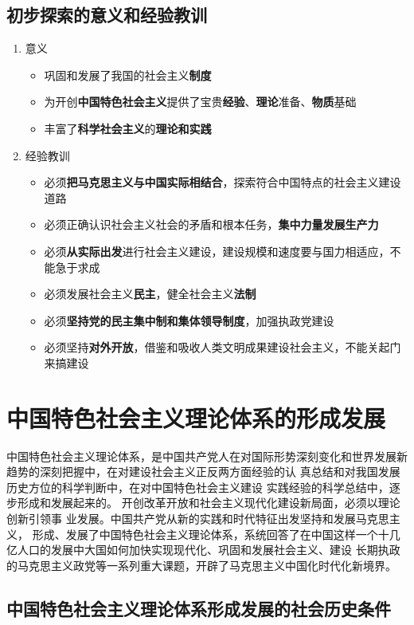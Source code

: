 \documentclass[12pt,openany]{ctexbook}
\begin{document}
\section{初步探索的意义和经验教训}
\begin{enumerate}
  \item 意义
\begin{itemize}
  \item 巩固和发展了我国的社会主义\textbf{制度}
  \item 为开创\textbf{中国特色社会主义}提供了宝贵\textbf{经验}、\textbf{理论}准备、\textbf{物质}基础
  \item 丰富了\textbf{科学社会主义}的\textbf{理论和实践}
\end{itemize}
  \item 经验教训
\begin{itemize}
  \item 必须\textbf{把马克思主义与中国实际相结合}，探索符合中国特点的社会主义建设道路
  \item 必须正确认识社会主义社会的矛盾和根本任务，\textbf{集中力量发展生产力}
  \item 必须\textbf{从实际出发}进行社会主义建设，建设规模和速度要与国力相适应，不能急于求成
  \item 必须发展社会主义\textbf{民主}，健全社会主义\textbf{法制}
  \item 必须\textbf{坚持党的民主集中制和集体领导制度}，加强执政党建设
  \item 必须坚持\textbf{对外开放}，借鉴和吸收人类文明成果建设社会主义，不能关起门来搞建设
\end{itemize}
\end{enumerate}
\chapter{中国特色社会主义理论体系的形成发展}
中国特色社会主义理论体系，是中国共产党人在对国际形势深刻变化和世界发展新趋势的深刻把握中，在对建设社会主义正反两方面经验的认 真总结和对我国发展历史方位的科学判断中，在对中国特色社会主义建设 实践经验的科学总结中，逐步形成和发展起来的。
开创改革开放和社会主义现代化建设新局面，必须以理论创新引领事 业发展。中国共产党从新的实践和时代特征出发坚持和发展马克思主义， 形成、发展了中国特色社会主义理论体系，系统回答了在中国这样一个十几亿人口的发展中大国如何加快实现现代化、巩固和发展社会主义、建设 长期执政的马克思主义政党等一系列重大课题，开辟了马克思主义中国化时代化新境界。
\section{中国特色社会主义理论体系形成发展的社会历史条件}
\end{document}
